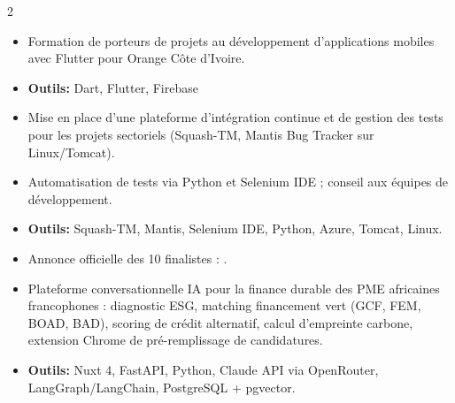 \documentclass[10pt,a4paper,ragged2e,withhyper]{altacv}
\begin{document}
\begin{paracol}{2}
            \begin{itemize}
                \item Formation de porteurs de projets au développement d'applications mobiles avec Flutter pour Orange Côte d'Ivoire.
                \item \textcolor{SecondaryColor}{\textbf{Outils: }} Dart, Flutter, Firebase
            \end{itemize}

        \divider

        \begin{itemize}
            \item Mise en place d'une plateforme d'intégration continue et de gestion des tests pour les projets sectoriels (Squash-TM, Mantis Bug Tracker sur Linux/Tomcat).
            \item Automatisation de tests via Python et Selenium IDE ; conseil aux équipes de développement.
            \item \textcolor{SecondaryColor}{\textbf{Outils: }} Squash-TM, Mantis, Selenium IDE, Python, Azure, Tomcat, Linux.
        \end{itemize}

            \begin{itemize}
                \item Annonce officielle des 10 finalistes : .
                \item Plateforme conversationnelle IA pour la finance durable des PME africaines francophones : diagnostic ESG, matching financement vert (GCF, FEM, BOAD, BAD), scoring de crédit alternatif, calcul d'empreinte carbone, extension Chrome de pré-remplissage de candidatures.
                \item \textcolor{SecondaryColor}{\textbf{Outils: }} Nuxt 4, FastAPI, Python, Claude API via OpenRouter, LangGraph/LangChain, PostgreSQL + pgvector.
            \end{itemize}
            \divider


\end{paracol}
\end{document}
